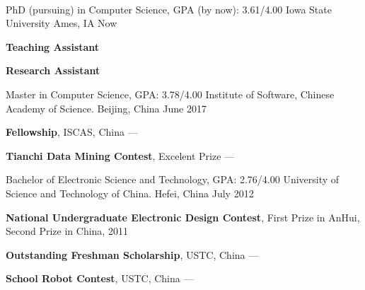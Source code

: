 \\
\begin{cventries}

  \cventry
    {PhD (pursuing) in Computer Science, GPA (by now): 3.61/4.00} %
    {Iowa State University} %
    {Ames, IA} %
    {Now} %
    {
      \begin{cvitems} %
         \item {\textbf{Teaching Assistant} }
         \vspace{0.5mm}
         \item {\textbf{Research Assistant} }
      \end{cvitems}
    }

  \cventry
    {Master in Computer Science, GPA: 3.78/4.00} %
    {Institute of Software, Chinese Academy of Science.} %
    {Beijing, China} %
    {June 2017} %
    {
      \begin{cvitems} %
         \item {\textbf{Fellowship}, ISCAS, China --- }
         \vspace{0.5mm}
         \item {\textbf{Tianchi Data Mining Contest}, Excelent Prize --- }
      \end{cvitems}
    }

  \cventry
    {Bachelor of Electronic Science and Technology, GPA: 2.76/4.00}
    {University of Science and Technology of China.}
    {Hefei, China}
    {July 2012}
    {
      \begin{cvitems}
        \item {\textbf{National Undergraduate Electronic Design Contest}, First Prize in AnHui, Second Prize in China, 2011}
        \vspace{0.5mm}
        \item {\textbf{Outstanding Freshman Scholarship}, USTC, China --- }
        \vspace{0.5mm}
        \item {\textbf{School Robot Contest}, USTC, China --- }
        \vspace{0.5mm}
      \end{cvitems}
    }
\end{cventries}
